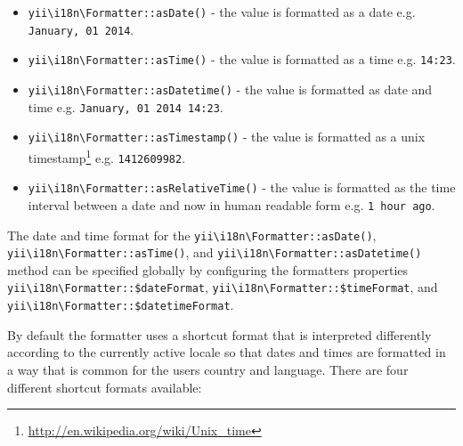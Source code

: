 \begin{itemize}
\item \texttt{yii{\allowbreak{}\textbackslash}i18n{\allowbreak{}\textbackslash}Formatter\allowbreak{}::\allowbreak{}asDate()} - the value is formatted as a date e.g. \lstinline|January, 01 2014|.
\item \texttt{yii{\allowbreak{}\textbackslash}i18n{\allowbreak{}\textbackslash}Formatter\allowbreak{}::\allowbreak{}asTime()} - the value is formatted as a time e.g. \lstinline|14:23|.
\item \texttt{yii{\allowbreak{}\textbackslash}i18n{\allowbreak{}\textbackslash}Formatter\allowbreak{}::\allowbreak{}asDatetime()} - the value is formatted as date and time e.g. \lstinline|January, 01 2014 14:23|.
\item \texttt{yii{\allowbreak{}\textbackslash}i18n{\allowbreak{}\textbackslash}Formatter\allowbreak{}::\allowbreak{}asTimestamp()} - the value is formatted as a unix timestamp\footnote{\url{http://en.wikipedia.org/wiki/Unix\_time}} e.g. \lstinline|1412609982|.
\item \texttt{yii{\allowbreak{}\textbackslash}i18n{\allowbreak{}\textbackslash}Formatter\allowbreak{}::\allowbreak{}asRelativeTime()} - the value is formatted as the time interval between a date
and now in human readable form e.g. \lstinline|1 hour ago|.
\end{itemize}
The date and time format for the \texttt{yii{\allowbreak{}\textbackslash}i18n{\allowbreak{}\textbackslash}Formatter\allowbreak{}::\allowbreak{}asDate()}, \texttt{yii{\allowbreak{}\textbackslash}i18n{\allowbreak{}\textbackslash}Formatter\allowbreak{}::\allowbreak{}asTime()}, and
\texttt{yii{\allowbreak{}\textbackslash}i18n{\allowbreak{}\textbackslash}Formatter\allowbreak{}::\allowbreak{}asDatetime()} method can be specified globally by configuring the formatters
properties \texttt{yii{\allowbreak{}\textbackslash}i18n{\allowbreak{}\textbackslash}Formatter\allowbreak{}::\allowbreak{}\$dateFormat}, \texttt{yii{\allowbreak{}\textbackslash}i18n{\allowbreak{}\textbackslash}Formatter\allowbreak{}::\allowbreak{}\$timeFormat}, and
\texttt{yii{\allowbreak{}\textbackslash}i18n{\allowbreak{}\textbackslash}Formatter\allowbreak{}::\allowbreak{}\$datetimeFormat}.

By default the formatter uses a shortcut format that is interpreted differently according to the currently active locale
so that dates and times are formatted in a way that is common for the users country and language.
There are four different shortcut formats available:

